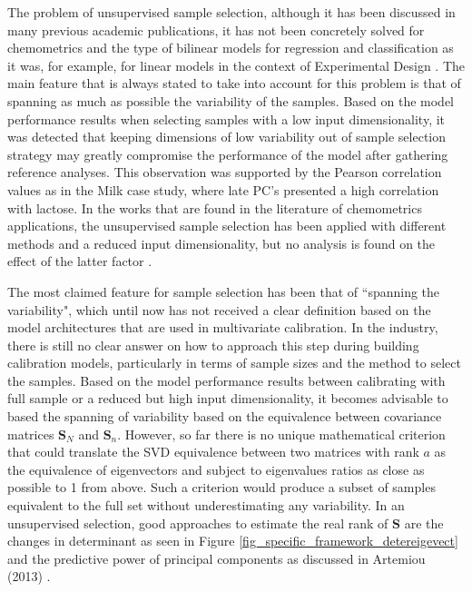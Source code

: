 \documentclass[journal=ancham,manuscript=article]{achemso}
\begin{document}
The problem of unsupervised sample selection, although it has been discussed in many previous academic publications, it has not been concretely solved for chemometrics and the type of bilinear models for regression and classification as it was, for example, for linear models in the context of Experimental Design \cite{Brandmaier2012, Goos2011}. The main feature that is always stated to take into account for this problem is that of spanning as much as possible the variability of the samples. Based on the model performance results when selecting samples with a low input dimensionality, it was detected that keeping dimensions of low variability out of sample selection strategy may greatly compromise the performance of the model after gathering reference analyses. This observation was supported by the Pearson correlation values as in the Milk case study, where late PC's presented a high correlation with lactose. In the works that are found in the literature of chemometrics applications, the unsupervised sample selection has been applied with different methods and a reduced input dimensionality, but no analysis is found on the effect of the latter factor \cite{Naes1990, Brandmaier2012, Nawar2018, Au2020}. 

The most claimed feature for sample selection has been that of ``spanning the variability", which until now has not received a clear definition based on the model architectures that are used in multivariate calibration. In the industry, there is still no clear answer on how to approach this step during building calibration models, particularly in terms of sample sizes and the method to select the samples. Based on the model performance results between calibrating with full sample or a reduced but high input dimensionality, it becomes advisable to based the spanning of variability based on the equivalence between covariance matrices $\mathbf{S}_N$ and $\mathbf{S}_n$. However, so far there is no unique mathematical criterion that could translate the SVD equivalence between two matrices with rank $a$ as the equivalence of eigenvectors and subject to eigenvalues ratios as close as possible to 1 from above. Such a criterion would produce a subset of samples equivalent to the full set without underestimating any variability. In an unsupervised selection, good approaches to estimate the real rank of $\mathbf{S}$ are the changes in determinant as seen in Figure \ref{fig_specific_framework_detereigevect} and the predictive power of principal components as discussed in Artemiou (2013) \cite{Artemiou2013}. 
\end{document}
